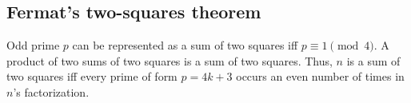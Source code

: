 \documentclass[12pt]{extarticle}
\begin{document}
\begin{multicols*}{2}


\subsection{Fermat's two-squares theorem}  Odd prime $p$ can be represented
as a sum of two squares iff $p \equiv 1 {\pmod 4}$.
A product of two sums of two squares is a sum of two squares.
Thus, $n$ is a sum of two squares iff every prime of
form $p=4k+3$ occurs an even number of times in $n$'s factorization.










\end{multicols*}
\end{document}
